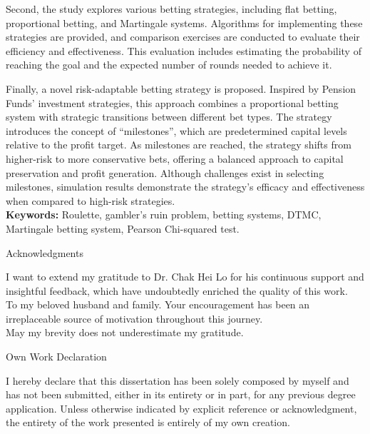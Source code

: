 \documentclass[11pt,twoside]{article}
\numberwithin{Theorem}{section}
\numberwithin{Definition}{section}
\numberwithin{Lemma}{section}
\numberwithin{Algorithm}{section}
\numberwithin{equation}{section}
\begin{document}
Second, the study explores various betting strategies, including flat betting, proportional betting, and Martingale systems. Algorithms for implementing these strategies are provided, and comparison exercises are conducted to evaluate their efficiency and effectiveness. This evaluation includes estimating the probability of reaching the goal and the expected number of rounds needed to achieve it. 

Finally, a novel risk-adaptable betting strategy is proposed. Inspired by Pension Funds' investment strategies, this approach combines a proportional betting system with strategic transitions between different bet types. The strategy introduces the concept of “milestones”, which are predetermined capital levels relative to the profit target. As milestones are reached, the strategy shifts from higher-risk to more conservative bets, offering a balanced approach to capital preservation and profit generation. Although challenges exist in selecting milestones, simulation results demonstrate the strategy’s efficacy and effectiveness when compared to high-risk strategies.\\

\textbf{Keywords:} Roulette, gambler's ruin problem, betting systems, DTMC, Martingale betting system, Pearson Chi-squared test.


\clearpage

\begin{center}
\Large{Acknowledgments}
\end{center}
\vspace{5em}


\noindent I want to extend my gratitude to Dr. Chak Hei Lo for his continuous support and insightful feedback, which have undoubtedly enriched the quality of this work.\\

\noindent To my beloved husband and family. Your encouragement has been an irreplaceable source of motivation throughout this journey.\\

May my brevity does not underestimate my gratitude.


\clearpage


\begin{center}
\Large{Own Work Declaration}
\end{center}
\vspace{5em}
I hereby declare that this dissertation has been solely composed by myself and has not been submitted, either in its entirety or in part, for any previous degree application. Unless otherwise indicated by explicit reference or acknowledgment, the entirety of the work presented is entirely of my own creation.
\end{document}
